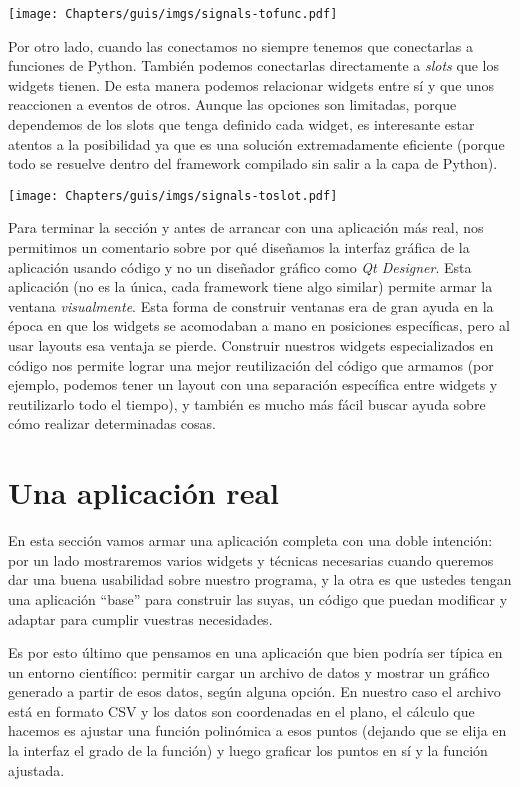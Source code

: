 \begin{center}
    \texttt{[image: Chapters/guis/imgs/signals-tofunc.pdf]}
\end{center}

Por otro lado, cuando las conectamos no siempre tenemos que conectarlas a funciones de Python. También podemos conectarlas directamente a \textit{slots} que los widgets tienen. De esta manera podemos relacionar widgets entre sí y que unos reaccionen a eventos de otros. Aunque las opciones son limitadas, porque dependemos de los slots que tenga definido cada widget, es interesante estar atentos a la posibilidad ya que es una solución extremadamente eficiente (porque todo se resuelve dentro del framework compilado sin salir a la capa de Python).

\begin{center}
    \texttt{[image: Chapters/guis/imgs/signals-toslot.pdf]}
\end{center}

Para terminar la sección y antes de arrancar con una aplicación más real, nos permitimos un comentario sobre por qué diseñamos la interfaz gráfica de la aplicación usando código y no un diseñador gráfico como \textit{Qt Designer}. Esta aplicación (no es la única, cada framework tiene algo similar) permite armar la ventana \textit{visualmente}. Esta forma de construir ventanas era de gran ayuda en la época en que los widgets se acomodaban a mano en posiciones específicas, pero al usar layouts esa ventaja se pierde. Construir nuestros widgets especializados en código nos permite lograr una mejor reutilización del código que armamos (por ejemplo, podemos tener un layout con una separación específica entre widgets y reutilizarlo todo el tiempo), y también es mucho más fácil buscar ayuda sobre cómo realizar determinadas cosas.


\section{Una aplicación real}

En esta sección vamos armar una aplicación completa con una doble intención: por un lado mostraremos varios widgets y técnicas necesarias cuando queremos dar una buena usabilidad sobre nuestro programa, y la otra es que ustedes tengan una aplicación ``base'' para construir las suyas, un código que puedan modificar y adaptar para cumplir vuestras necesidades.

Es por esto último que pensamos en una aplicación que bien podría ser típica en un entorno científico: permitir cargar un archivo de datos y mostrar un gráfico generado a partir de esos datos, según alguna opción. En nuestro caso el archivo está en formato CSV y los datos son coordenadas en el plano, el cálculo que hacemos es ajustar una función polinómica a esos puntos (dejando que se elija en la interfaz el grado de la función) y luego graficar los puntos en sí y la función ajustada.

